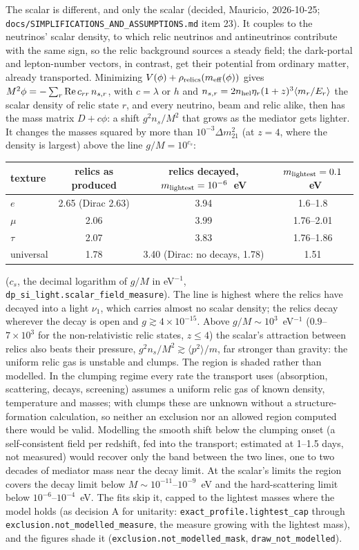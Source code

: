 \documentclass[11pt,a4paper]{article}
\newcommand{\file}[1]{\nolinkurl{#1}}
\begin{document}
The scalar is different, and only the scalar (decided, Mauricio, 2026-10-25; \file{docs/SIMPLIFICATIONS\_AND\_ASSUMPTIONS.md}
item 23). It couples to the neutrinos' scalar density, to which relic neutrinos and antineutrinos contribute with the
same sign, so the relic background sources a steady field; the dark-portal and lepton-number vectors, in contrast, get
their potential from ordinary matter, already transported. Minimizing $V(\phi) + \rho_{\rm relics}(m_{\rm eff}(\phi))$
gives $M^2\phi = -\sum_r{\rm Re}\,c_{rr}\,n_{s,r}$, with $c = \lambda$ or $h$ and $n_{s,r} = 2n_{\rm hel}\eta_r(1+z)^3
\langle m_r/E_r\rangle$ the scalar density of relic state $r$, and every neutrino, beam and relic alike, then has the
mass matrix $D + c\phi$: a shift $g^2n_s/M^2$ that grows as the mediator gets lighter. It changes the masses squared by
more than $10^{-3}\Delta m^2_{21}$ (at $z = 4$, where the density is largest) above the line $g/M = 10^{c_s}$:
\begin{center}
\begin{tabular}{lccc}
texture & relics as produced & relics decayed, $m_{\rm lightest} = 10^{-6}$~eV & $m_{\rm lightest} = 0.1$~eV \\ \hline
$e$ & 2.65 (Dirac 2.63) & 3.94 & 1.6--1.8 \\
$\mu$ & 2.06 & 3.99 & 1.76--2.01 \\
$\tau$ & 2.07 & 3.83 & 1.76--1.86 \\
universal & 1.78 & 3.40 (Dirac: no decays, 1.78) & 1.51 \\
\end{tabular}
\end{center}
($c_s$, the decimal logarithm of $g/M$ in eV$^{-1}$, \texttt{dp\_si\_light.scalar\_field\_measure}). The line is
highest where the relics have decayed into a light $\nu_1$, which carries almost no scalar density; the relics decay
wherever the decay is open and $g \gtrsim 4\times10^{-15}$. Above $g/M \sim 10^3$~eV$^{-1}$ ($0.9$--$7\times10^3$ for the
non-relativistic relic states, $z \le 4$) the scalar's attraction between relics also beats their pressure, $g^2n_s/M^2
\gtrsim \langle p^2\rangle/m$, far stronger than gravity: the uniform relic gas is unstable and clumps. The region is shaded
rather than modelled. In the clumping regime every rate the transport uses (absorption, scattering, decays, screening)
assumes a uniform relic gas of known density, temperature and masses; with clumps these are unknown without a
structure-formation calculation, so neither an exclusion nor an allowed region computed there would be valid. Modelling
the smooth shift below the clumping onset (a self-consistent field per redshift, fed into the transport; estimated at
1--1.5 days, not measured) would recover only the band between the two lines, one to two decades of mediator mass near
the decay limit. At the scalar's limits the region covers the decay limit below $M \sim 10^{-11}$--$10^{-9}$~eV and the
hard-scattering limit below $10^{-6}$--$10^{-4}$~eV. The fits skip it, capped to the lightest masses where the model
holds (as decision A for unitarity: \texttt{exact\_profile.lightest\_cap} through \texttt{exclusion.not\_modelled\_measure},
the measure growing with the lightest mass), and the figures shade it (\texttt{exclusion.not\_modelled\_mask},
\texttt{draw\_not\_modelled}).
\end{document}
